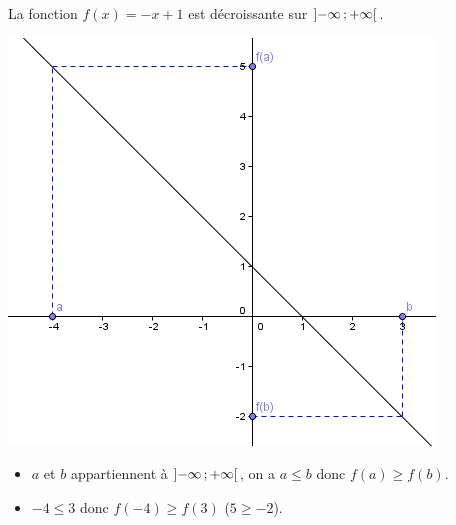 	\begin{myex}
		La fonction $f(x) = -x + 1$ est décroissante sur $\mbox{\ensuremath{\left]- \infty \mathpunct{};+ \infty\right[}}$.
		\begin{center}
			\includegraphics[scale=0.65]{./img/decroiss}
		\end{center}
		
		\begin{itemize}
			\item $a$ et $b$ appartiennent à $\mbox{\ensuremath{\left]- \infty \mathpunct{};+ \infty\right[}}$, on a $a \leq b$ donc $f(a) \geq f(b)$.
			
			\item $-4 \leq 3$ donc $f(-4) \geq f(3)$ ($5 \geq -2 $).
		\end{itemize}
		
	\end{myex}